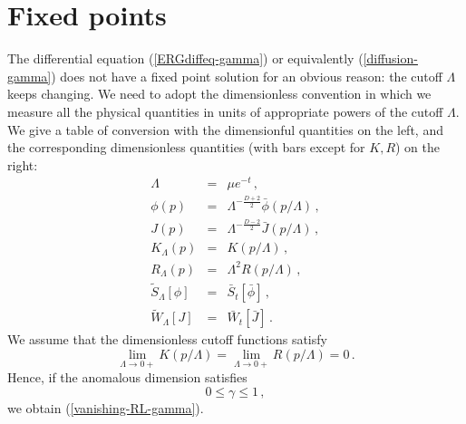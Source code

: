 \documentclass[aps,prd,preprint,groupedaddress,preprintnumbers,longbibliography]{revtex4-1}
\begin{document}
\section{Fixed points \label{fixed-points}}

The differential equation (\ref{ERGdiffeq-gamma}) or equivalently
(\ref{diffusion-gamma}) does not have a fixed point solution for an
obvious reason: the cutoff $\Lambda$ keeps changing.  We need to adopt
the dimensionless convention in which we measure all the physical
quantities in units of appropriate powers of the cutoff $\Lambda$.  We
give a table of conversion with the dimensionful quantities on the
left, and the corresponding dimensionless quantities (with bars except
for $K, R$) on the right:
\begin{subequations}
\label{table-conversion}
\begin{eqnarray}
\Lambda &=& \mu e^{-t}\,,\\
\phi (p) &=& \Lambda^{-\frac{D+2}{2}} \bar{\phi} (p/\Lambda)\,,\\
J(p) &=& \Lambda^{-\frac{D-2}{2}} \bar{J} (p/\Lambda)\,,\label{JJbar}\\
K_\Lambda (p) &=& K(p/\Lambda)\,,\\
R_\Lambda (p) &=& \Lambda^2 R (p/\Lambda)\,,\\
\tilde{S}_\Lambda [\phi] &=& \bar{S}_t [\bar{\phi}]\,,\\
\tilde{W}_\Lambda [J] &=& \bar{W}_t [\bar{J}]\,.
\end{eqnarray}
\end{subequations}
We assume that the dimensionless cutoff functions satisfy
\begin{equation}
\lim_{\Lambda \to 0+} K(p/\Lambda) = \lim_{\Lambda \to 0+} R
(p/\Lambda) = 0\,.
\end{equation}
Hence, if the anomalous dimension satisfies
\begin{equation}
0 \le \gamma \le 1\,,
\end{equation}
we obtain (\ref{vanishing-RL-gamma}).
\end{document}
